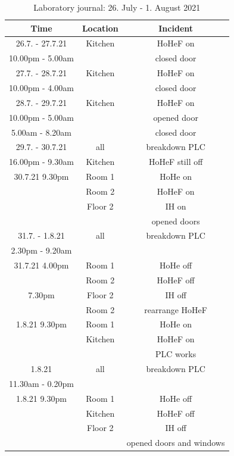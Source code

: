 \begin{table}[H]
    \centering
    \begin{tabular}{c|c|c}
        \textbf{Time} & \textbf{Location} & \textbf{Incident}\\
        \hline
        \hline
        26.7. - 27.7.21 & Kitchen & HoHeF on\\
        10.00pm - 5.00am & & closed door\\
        \hline
        27.7. - 28.7.21 & Kitchen & HoHeF on\\
        10.00pm - 4.00am & & closed door\\
        \hline
        28.7. - 29.7.21 & Kitchen & HoHeF on\\
        10.00pm - 5.00am & & opened door\\
        5.00am - 8.20am & & closed door\\
        \hline
        29.7. - 30.7.21 & all & breakdown PLC\\
        16.00pm - 9.30am & Kitchen & HoHeF still off\\
        \hline
        30.7.21 9.30pm & Room 1 & HoHe on\\
        & Room 2 & HoHeF on\\
        & Floor 2 & IH on\\
        && opened doors\\
        \hline
        31.7. - 1.8.21 & all & breakdown PLC\\
        2.30pm - 9.20am &&\\
        \hline
        31.7.21 4.00pm & Room 1 & HoHe off\\
        & Room 2 & HoHeF off\\
        7.30pm & Floor 2 & IH off\\
         & Room 2 & rearrange HoHeF \\
        \hline
        1.8.21 9.30pm & Room 1 & HoHe on\\
        & Kitchen & HoHeF on\\
       && PLC works\\
       \hline
        1.8.21 & all & breakdown PLC\\
        11.30am - 0.20pm &&\\
        \hline
        1.8.21 9.30pm & Room 1 & HoHe off\\
        & Kitchen & HoHeF off\\
        & Floor 2 & IH off\\
        && opened doors and windows\\
    \end{tabular}
    \caption{Laboratory journal: 26. July - 1. August 2021}
    \label{tab:Experiment2app}
\end{table}


